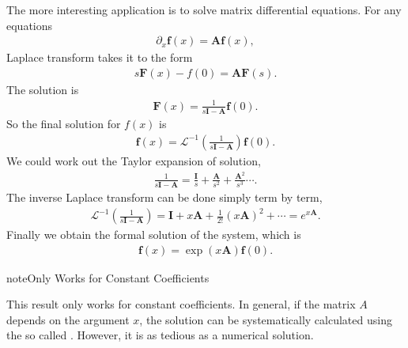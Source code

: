 \documentclass[letterpaper,10pt,english]{sphinxmanual}
\begin{document}
The more interesting application is to solve matrix differential equations. For any equations
\begin{equation*}
\begin{split}\partial_x \mathbf f(x) = \mathbf A \mathbf f(x),\end{split}
\end{equation*}
Laplace transform takes it to the form
\begin{equation*}
\begin{split}s \mathbf F(x) - f(0) = \mathbf A \mathbf F(s).\end{split}
\end{equation*}
The solution is
\begin{equation*}
\begin{split}\mathbf F(x) = \frac{1}{s \mathbf I - \mathbf A} \mathbf f(0) .\end{split}
\end{equation*}
So the final solution for \(f(x)\) is
\begin{equation*}
\begin{split}\mathbf f(x) = \mathcal L^{-1} \left(\frac{1}{s \mathbf I - \mathbf A} \right)\mathbf f(0).\end{split}
\end{equation*}
We could work out the Taylor expansion of solution,
\begin{equation*}
\begin{split}\frac{1}{s \mathbf I - \mathbf A} = \frac{\mathbf I}{s}+ \frac{\mathbf A}{s^2} + \frac{\mathbf A^2}{s^3} \cdots.\end{split}
\end{equation*}
The inverse Laplace transform can be done simply term by term,
\begin{equation*}
\begin{split}\mathcal L^{-1} \left(\frac{1}{s \mathbf I - \mathbf A} \right) = \mathbf I + x \mathbf A + \frac{1}{2!} (x \mathbf A)^2 + \cdots = e^{x \mathbf A}.\end{split}
\end{equation*}
Finally we obtain the formal solution of the system, which is
\begin{equation*}
\begin{split}\mathbf f(x) = \exp\left( x \mathbf A \right)\mathbf f(0).\end{split}
\end{equation*}
\begin{sphinxadmonition}{note}{Only Works for Constant Coefficients}

This result only works for constant coefficients. In general, if the matrix \(A\) depends on the argument \(x\), the solution can be systematically calculated using the so called . However, it is as tedious as a numerical solution.
\end{sphinxadmonition}
\end{document}
